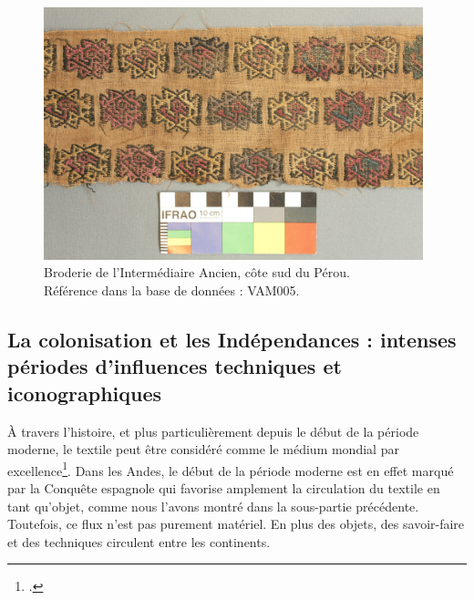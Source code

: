 \begin{figure}[!ht]
       \begin{center}
        		\includegraphics[width=11cm]{../images/VAM005.jpg}
	\end{center}
    \caption{Broderie de l'Intermédiaire Ancien, côte sud du Pérou.\\ Référence dans la base de données : VAM005.}
    \label{fig:VAM005}
\end{figure}

\subsection{La colonisation et les Indépendances : intenses périodes d'influences techniques et iconographiques}

\og À travers l'histoire, et plus particulièrement depuis le début de la période moderne, le textile peut être considéré comme le médium mondial par excellence\footcite[p.~21]{ferreiraTextilesPeriodeModerne2016}\fg. Dans les Andes, le début de la période moderne est en effet marqué par la Conquête espagnole qui favorise amplement la circulation du textile en tant qu'objet, comme nous l'avons montré dans la sous-partie précédente. Toutefois, ce flux n'est pas purement matériel. En plus des objets, des savoir-faire et des techniques circulent entre les continents.

